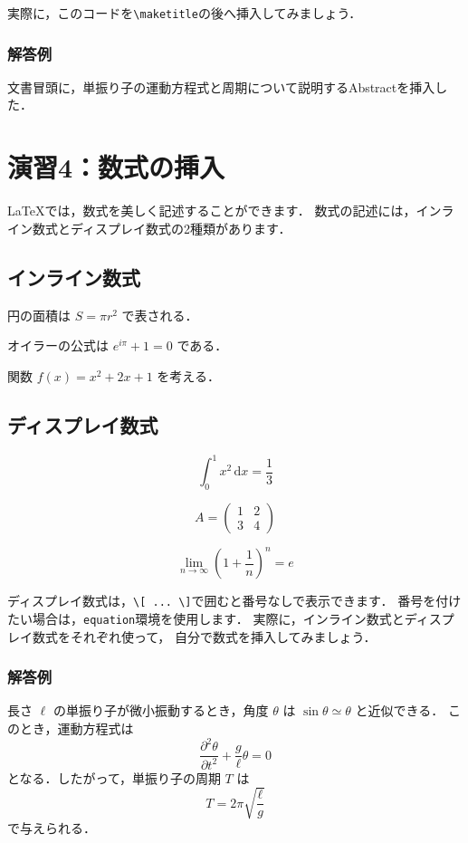 \documentclass[a4paper,twocolumn]{ltjsarticle}
\newcommand{\dif}{\mathrm{d}}
\newcommand{\pdd}[2]{\frac{\partial^2 #1}{\partial #2^2}}
\begin{document}
実際に，このコードを\verb|\maketitle|の後へ挿入してみましょう．

\subsubsection*{解答例}
文書冒頭に，単振り子の運動方程式と周期について説明するAbstractを挿入した．

\section*{演習4：数式の挿入}
LaTeXでは，数式を美しく記述することができます．
数式の記述には，インライン数式とディスプレイ数式の2種類があります．

\subsection*{インライン数式}
円の面積は $S=\pi r^2$ で表される．

オイラーの公式は $e^{i\pi}+1=0$ である．

関数 $f(x)=x^2+2x+1$ を考える．

\subsection*{ディスプレイ数式}
\begin{equation}
\int_{0}^{1} x^2\,\dif x=\frac{1}{3}
\label{eq:integral}
\end{equation}

\begin{equation}
A=
\begin{pmatrix}
1 & 2\\
3 & 4
\end{pmatrix}
\label{eq:matrix}
\end{equation}

\begin{equation}
\lim_{n\to\infty}
\left(1+\frac{1}{n}\right)^n=e
\label{eq:euler}
\end{equation}

ディスプレイ数式は，\verb|\[ ... \]|で囲むと番号なしで表示できます．
番号を付けたい場合は，\verb|equation|環境を使用します．
実際に，インライン数式とディスプレイ数式をそれぞれ使って，
自分で数式を挿入してみましょう．

\subsubsection*{解答例}
長さ $\ell$ の単振り子が微小振動するとき，角度 $\theta$ は
$\sin\theta\simeq\theta$ と近似できる．
このとき，運動方程式は
\begin{equation}
\pdd{\theta}{t}+\frac{g}{\ell}\theta=0
\label{eq:pendulum}
\end{equation}
となる．したがって，単振り子の周期 $T$ は
\begin{equation}
T=2\pi\sqrt{\frac{\ell}{g}}
\label{eq:period}
\end{equation}
で与えられる．
\end{document}
